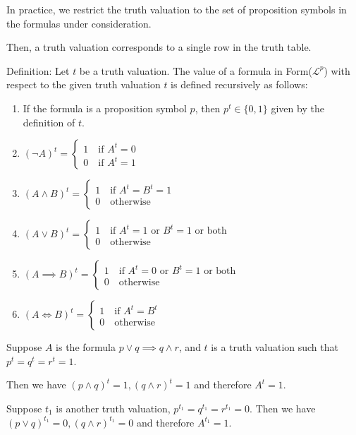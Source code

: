 \documentclass{article}
\begin{document}
In practice, we restrict the truth valuation to the set of proposition symbols in the formulas under consideration. 

Then, a truth valuation corresponds to a single row in the truth table. 

Definition: Let $t$ be a truth valuation. The value of a formula in Form($\mathcal{L}^p$) with respect to the given truth valuation $t$ is defined recursively as follows: 
\begin{enumerate}
    \item If the formula is a proposition symbol $p$, then $p^t \in \{0,1\}$ given by the definition of $t$. 
    \item $(\neg A)^t = \begin{cases}
        1 \quad \text{if } A^t = 0 \\
        0 \quad \text{if } A^t = 1
    \end{cases}$
    \item $(A \wedge B)^t = \begin{cases}
        1 \quad \text{if } A^t = B^t = 1 \\
        0 \quad \text{otherwise}
    \end{cases}$
    \item $(A \vee B)^t = \begin{cases}
        1 \quad \text{if } A^t = 1  \text{ or } B^t = 1 \text{ or both}\\
        0 \quad \text{otherwise}
    \end{cases}$
    \item $(A \implies B)^t = \begin{cases}
        1 \quad \text{if } A^t = 0  \text{ or } B^t = 1 \text{ or both}\\
        0 \quad \text{otherwise}
    \end{cases}$
    \item $(A \iff B)^t = \begin{cases}
        1 \quad \text{if } A^t = B^t\\
        0 \quad \text{otherwise}
    \end{cases}$
\end{enumerate}

Suppose $A$ is the formula $p \vee q \implies q \wedge r$, and $t$ is a truth valuation such that $p^t = q^t = r^t = 1$. 

Then we have $(p \wedge q)^t =1, (q \wedge r)^t = 1$ and therefore $A^t = 1$. 

Suppose $t_1$ is another truth valuation, $p^{t_1} = q^{t_1} = r^{t_1} = 0$. Then we have $(p \vee q)^{t_1} = 0, (q \wedge r)^{t_1} = 0$ and therefore $A^{t_1} = 1$. 
\end{document}

